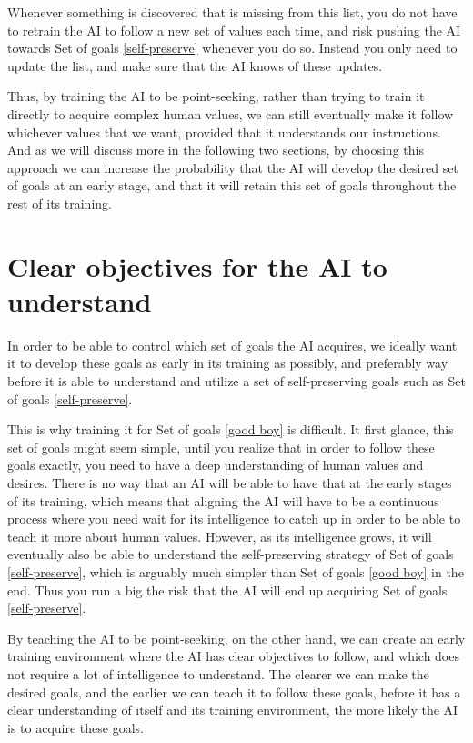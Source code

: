 \documentclass{article}
\begin{document}
Whenever something is discovered that is missing from this list, you do not have to retrain the AI to follow a new set of values each time, and risk pushing the AI towards Set of goals \ref{self-preserve} whenever you do so. Instead you only need to update the list, and make sure that the AI knows of these updates.

Thus, by training the AI to be point-seeking, rather than trying to train it directly to acquire complex human values, we can still eventually make it follow whichever values that we want, provided that it understands our instructions. And as we will discuss more in the following two sections, by choosing this approach we can increase the probability that the AI will develop the desired set of goals at an early stage, and that it will retain this set of goals throughout the rest of its training.


\section{Clear objectives for the AI to understand}

In order to be able to control which set of goals the AI acquires, we ideally want it to develop these goals as early in its training as possibly, and preferably way before it is able to understand and utilize a set of self-preserving goals such as Set of goals \ref{self-preserve}.

This is why training it for Set of goals \ref{good boy} is difficult. It first glance, this set of goals might seem simple, until you realize that in order to follow these goals exactly, you need to have a deep understanding of human values and desires. There is no way that an AI will be able to have that at the early stages of its training, %
which means that aligning the AI will have to be a continuous process
where you need wait for its intelligence to catch up in order to be able to teach it more about human values. However, as its intelligence grows, it will eventually also be able to understand the self-preserving strategy of Set of goals \ref{self-preserve}, which is arguably much simpler than Set of goals \ref{good boy} in the end. Thus you run a big the risk that the AI will end up acquiring Set of goals \ref{self-preserve}.

By teaching the AI to be point-seeking, on the other hand, we can create an early training environment where the AI has clear objectives to follow, and which does not require a lot of intelligence to understand. The clearer we can make the desired goals, and the earlier we can teach it to follow these goals, before it has a clear understanding of itself and its training environment, the more likely the AI is to acquire these goals.
\end{document}
